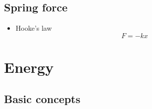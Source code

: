     \subsection{Spring force}
        \begin{itemize}
            \item Hooke's law
                \begin{equation}
                    F=-kx
                \end{equation}
        \end{itemize}

\section{Energy}
    \subsection{Basic concepts}
